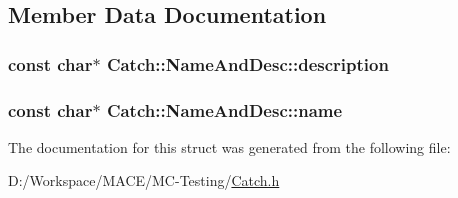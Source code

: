 \subsection{Member Data Documentation}
\subsubsection[{\texorpdfstring{description}{description}}]{\setlength{\rightskip}{0pt plus 5cm}const char$\ast$ Catch\+::\+Name\+And\+Desc\+::description}\hypertarget{struct_catch_1_1_name_and_desc_a3463a23ff65ce494fc380452b57b7970}{}\label{struct_catch_1_1_name_and_desc_a3463a23ff65ce494fc380452b57b7970}
\subsubsection[{\texorpdfstring{name}{name}}]{\setlength{\rightskip}{0pt plus 5cm}const char$\ast$ Catch\+::\+Name\+And\+Desc\+::name}\hypertarget{struct_catch_1_1_name_and_desc_a374b4ed8be3cf98be20ebde5273bde51}{}\label{struct_catch_1_1_name_and_desc_a374b4ed8be3cf98be20ebde5273bde51}


The documentation for this struct was generated from the following file\+:\begin{DoxyCompactItemize}
\item 
D\+:/\+Workspace/\+M\+A\+C\+E/\+M\+C-\/\+Testing/\hyperlink{_catch_8h}{Catch.\+h}\end{DoxyCompactItemize}
